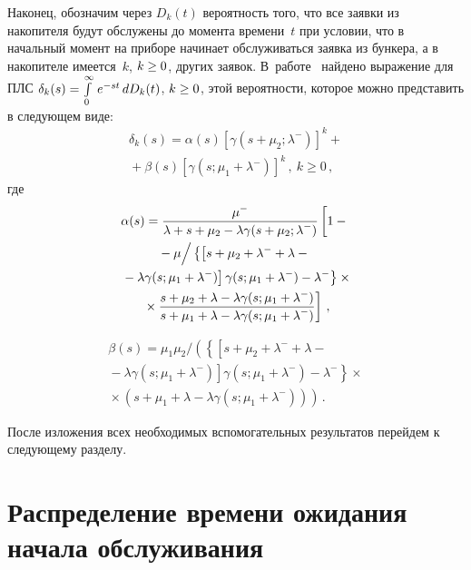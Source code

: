 \begin{multicols}{2}
Наконец, обозначим через $D_k(t)$ вероятность того, что все заявки
из накопителя будут обслужены до момента времени~$t$
при условии, что в начальный момент на приборе начинает обслуживаться заявка из бункера,
а в накопителе имеется~$k$, $k \hm\ge 0$, других заявок.
В~работе~\cite{6} найдено выражение для ПЛС $\delta_k(s)\hm=\int\limits_{0}^{\infty} \,e^{-st}\,dD_k(t)$, $k\hm \ge 0$,
этой вероятности, которое можно представить в следующем виде:
\begin{multline*}
\delta_k(s) = \alpha (s) \left[\gamma(s+\mu_2;\lambda^-)\right]^k
+ {}\\
{}+\beta (s) \left[\gamma(s;\mu_1 + \lambda^-)\right]^k\,, \ k \ge 0\,,
\end{multline*}
где
\begin{multline*}
\alpha (s) = \fr{\mu^- }{\lambda + s+\mu_2 - \lambda \gamma(s+\mu_2;\lambda^-)}
\left [ \vphantom{\fr{s + \mu_2 + \lambda - \lambda \gamma(s; \mu_1+ \lambda^-) }
{s + \mu_1 + \lambda  - \lambda\gamma(s; \mu_1 +\lambda^-)}}
 1 -{}\right.\\
{}- { \mu}\Big / 
\left\{\left[ 
s+\mu_2 + \lambda^- + \lambda
- {}\right.\right.\\
\left.\left.{}-\lambda \gamma(s; \mu_1 + \lambda^-) \right] \gamma(s; \mu_1 + \lambda^-) - \lambda^- \right\}
\times{}
\\
\left.{}\times
\fr{s + \mu_2 + \lambda - \lambda \gamma(s; \mu_1+ \lambda^-) }
{s + \mu_1 + \lambda  - \lambda\gamma(s; \mu_1 +\lambda^-)}
\right ]\,,
\end{multline*}

\vspace*{-12pt}

\noindent
\begin{multline*}
\beta (s)=  \mu_1 \mu_2 /\left(\left\{
\left[ s+\mu_2 + \lambda^- + \lambda-{}\right.\right.\right.\\
\left.\left.\left.{}-
\lambda \gamma(s;\mu_1+\lambda^-)
\right] \gamma(s;\mu_1+\lambda^-) -
\lambda^- \right\}\times{}\right.
\\
\left.{}\times
 ( s+\mu_1  + \lambda - \lambda \gamma(s; \mu_1+\lambda^-))\right)\,.
\end{multline*}

После изложения всех необходимых вспомогательных результатов
перейдем к следующему раз\-делу.

\section{Распределение времени ожидания начала обслуживания}


\end{multicols}
